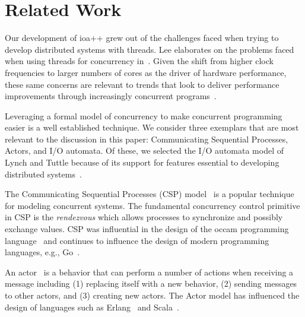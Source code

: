 \section{Related Work\label{related_work}}

Our development of ioa++ grew out of the challenges faced when trying to develop distributed systems with threads.
Lee elaborates on the problems faced when using threads for concurrency in~\cite{lee2006problem}.
Given the shift from higher clock frequencies to larger numbers of cores as the driver of hardware performance, these same concerns are relevant to trends that look to deliver performance improvements through increasingly concurrent programs~\cite{sutter2005software}.

Leveraging a formal model of concurrency to make concurrent programming easier is a well established technique.
We consider three exemplars that are most relevant to the discussion in this paper: Communicating Sequential Processes, Actors, and I/O automata.
Of these, we selected the I/O automata model of Lynch and Tuttle\cite{lynch1987hierarchical} because of its support for features essential to developing distributed systems~\cite{lynch1996distributed}.

The Communicating Sequential Processes (CSP) model~\cite{hoare1978communicating} is a popular technique for modeling concurrent systems.
The fundamental concurrency control primitive in CSP is the \emph{rendezvous} which allows processes to synchronize and possibly exchange values.
CSP was influential in the design of the occam programming language~\cite{jones1987programming} and continues to influence the design of modern programming languages, e.g., Go~\cite{go}.

An actor~\cite{agha1986actors} is a behavior that can perform a number of actions when receiving a message including (1) replacing itself with a new behavior, (2) sending messages to other actors, and (3) creating new actors.
The Actor model has influenced the design of languages such as Erlang~\cite{armstrong1996concurrent} and Scala~\cite{odersky2004overview}.


